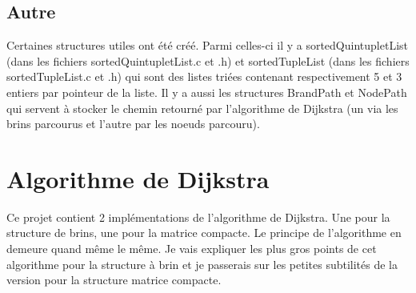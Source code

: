\documentclass[11pt]{article}
\begin{document}
\subsection{Autre}
Certaines structures utiles ont été créé. Parmi celles-ci il y a sortedQuintupletList (dans les fichiers sortedQuintupletList.c et .h) et sortedTupleList (dans les fichiers sortedTupleList.c et .h) qui sont des listes triées contenant respectivement 5 et 3 entiers par pointeur de la liste.
Il y a aussi les structures BrandPath et NodePath qui servent à stocker le chemin retourné par l'algorithme de Dijkstra (un via les brins parcourus et l'autre par les noeuds parcouru).\\
\section{Algorithme de Dijkstra} 

Ce projet contient 2 implémentations de l'algorithme de Dijkstra. Une pour la structure de brins, une pour la matrice compacte. Le principe de l'algorithme en demeure quand même le même. Je vais expliquer les plus gros points de cet algorithme pour la structure à brin et je passerais sur les petites subtilités de la version pour la structure matrice compacte.
\end{document}
